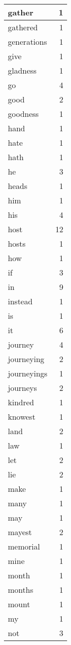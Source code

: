 \begin{center}
\begin{longtable}{l|r}
gather & 1 \\ \hline
gathered & 1 \\ \hline
generations & 1 \\ \hline
give & 1 \\ \hline
gladness & 1 \\ \hline
go & 4 \\ \hline
good & 2 \\ \hline
goodness & 1 \\ \hline
hand & 1 \\ \hline
hate & 1 \\ \hline
hath & 1 \\ \hline
he & 3 \\ \hline
heads & 1 \\ \hline
him & 1 \\ \hline
his & 4 \\ \hline
host & 12 \\ \hline
hosts & 1 \\ \hline
how & 1 \\ \hline
if & 3 \\ \hline
in & 9 \\ \hline
instead & 1 \\ \hline
is & 1 \\ \hline
it & 6 \\ \hline
journey & 4 \\ \hline
journeying & 2 \\ \hline
journeyings & 1 \\ \hline
journeys & 2 \\ \hline
kindred & 1 \\ \hline
knowest & 1 \\ \hline
land & 2 \\ \hline
law & 1 \\ \hline
let & 2 \\ \hline
lie & 2 \\ \hline
make & 1 \\ \hline
many & 1 \\ \hline
may & 1 \\ \hline
mayest & 2 \\ \hline
memorial & 1 \\ \hline
mine & 1 \\ \hline
month & 1 \\ \hline
months & 1 \\ \hline
mount & 1 \\ \hline
my & 1 \\ \hline
not & 3 \\ \hline

\end{longtable}
\end{center}
